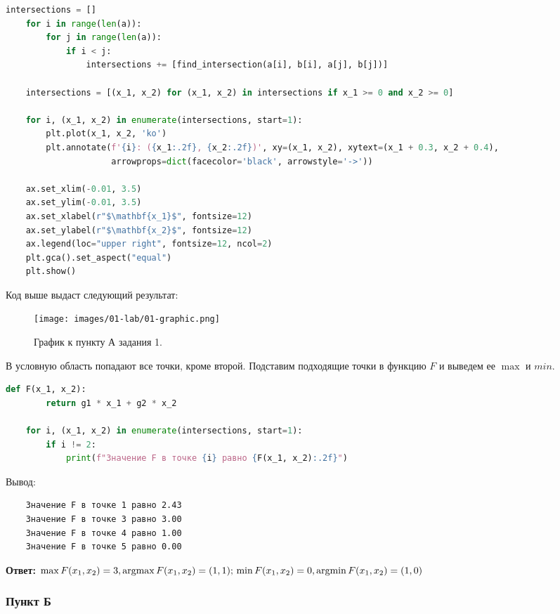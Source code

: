 \begin{lstlisting}[language=Python, label=code: 01-lab-01-code]
    intersections = []
    for i in range(len(a)):
        for j in range(len(a)):
            if i < j:
                intersections += [find_intersection(a[i], b[i], a[j], b[j])]
    
    intersections = [(x_1, x_2) for (x_1, x_2) in intersections if x_1 >= 0 and x_2 >= 0]
    
    for i, (x_1, x_2) in enumerate(intersections, start=1):
        plt.plot(x_1, x_2, 'ko')
        plt.annotate(f'{i}: ({x_1:.2f}, {x_2:.2f})', xy=(x_1, x_2), xytext=(x_1 + 0.3, x_2 + 0.4),
                     arrowprops=dict(facecolor='black', arrowstyle='->'))
    
    ax.set_xlim(-0.01, 3.5)
    ax.set_ylim(-0.01, 3.5)
    ax.set_xlabel(r"$\mathbf{x_1}$", fontsize=12)
    ax.set_ylabel(r"$\mathbf{x_2}$", fontsize=12)
    ax.legend(loc="upper right", fontsize=12, ncol=2)
    plt.gca().set_aspect("equal")
    plt.show()

\end{lstlisting}

Код выше выдаст следующий результат:
\begin{figure}[H]
    \texttt{[image: images/01-lab/01-graphic.png]}
    \caption{График к пункту А задания 1.}
    \label{fig:01-lab-01-graphic}
\end{figure}

В условную область попадают все точки, кроме второй. Подставим подходящие точки в функцию $F$ и выведем ее $\max$ и $min$.

\begin{lstlisting}[language=Python]
    def F(x_1, x_2):
        return g1 * x_1 + g2 * x_2

    for i, (x_1, x_2) in enumerate(intersections, start=1):
        if i != 2:
            print(f"Значение F в точке {i} равно {F(x_1, x_2):.2f}")
\end{lstlisting}

Вывод:
\begin{verbatim}
    Значение F в точке 1 равно 2.43
    Значение F в точке 3 равно 3.00
    Значение F в точке 4 равно 1.00
    Значение F в точке 5 равно 0.00
\end{verbatim}

\textbf{Ответ:} $\max F(x_1, x_2) = 3, \operatorname*{argmax} F(x_1, x_2) = (1, 1);\\
\min F(x_1, x_2) = 0, \operatorname*{argmin} F(x_1, x_2) = (1, 0)$ 

\subsubsection{Пункт Б}

